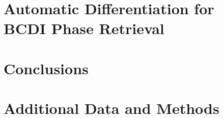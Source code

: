 \documentclass[12pt]{book}
\begin{document}
\chapter{Automatic Differentiation for BCDI Phase Retrieval}
\label{chap:AD_phase_retrieval}


\chapter{Conclusions}
\label{chap:conclusions}


\appendix
\chapter{Additional Data and Methods}
\label{chap:appendix}



% 
\printbibliography
{}


\begin{appendices}%
\appendixheaderon
\label{part:annexe}

\end{appendices}
\end{document}
